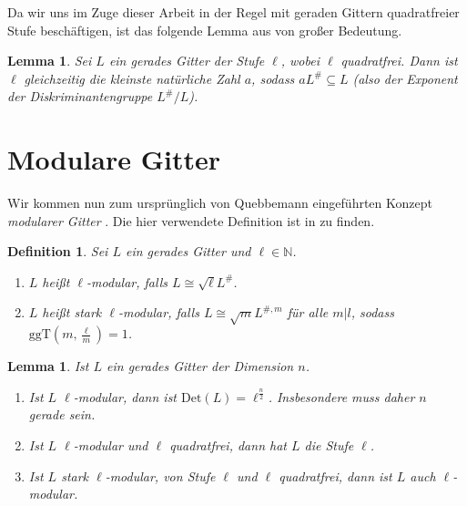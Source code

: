 \documentclass[12pt,a4paper,halfparskip,headsepline,bibtotocnumbered]{scrreprt}
\theoremstyle{nummermitklammern}
\newtheorem{definition}[defsatzusw]{Definition}
\newtheorem{lemma}[defsatzusw]{Lemma}
\theoremstyle{nonumberbreak}
\newcommand{\N}{\mathbb{N}}
\newcommand{\Det}{\text{Det}}
\begin{document}
Da wir uns im Zuge dieser Arbeit in der Regel mit geraden Gittern quadratfreier Stufe beschäftigen, ist das folgende Lemma aus \cite[Lemma 1.1.1]{juergens} von großer Bedeutung.

\begin{framed}
	\begin{lemma}\label{lem:level}
		Sei $L$ ein gerades Gitter der Stufe $\ell$, wobei $\ell$ quadratfrei. Dann ist $\ell$ gleichzeitig die kleinste natürliche Zahl $a$, sodass $a L^\# \subseteq L$ (also der Exponent der Diskriminantengruppe $L^\# / L$).
	\end{lemma}
\end{framed}

\section{Modulare Gitter}

Wir kommen nun zum ursprünglich von Quebbemann eingeführten Konzept \textit{modularer Gitter} \cite{quebbemann}. Die hier verwendete Definition ist in \cite{fluckiger} zu finden.

\begin{framed}
	\begin{definition}
		Sei $L$ ein gerades Gitter und $\ell \in \N$.
		\begin{enumerate}[label=(\roman*)]
			\item $L$ heißt \textit{$\ell$-modular}, falls $L \cong \sqrt{\ell}L^\#$.
			\item $L$ heißt \textit{stark $\ell$-modular}, falls $L \cong \sqrt{m} L^{\#,m}$ für alle $m \vert l$, sodass $\text{ggT}(m,\frac{\ell}{m}) = 1$.
		\end{enumerate}
	\end{definition}
\end{framed}

\begin{framed}
	\begin{lemma}\label{lem:mod}
		Ist $L$ ein gerades Gitter der Dimension $n$.
		\begin{enumerate}[label=(\roman*)]
			\item Ist $L$ $\ell$-modular, dann ist $\Det(L) = \ell^{\frac{n}{2}}$. Insbesondere muss daher $n$ gerade sein.
			\item Ist $L$ $\ell$-modular und $\ell$ quadratfrei, dann hat $L$ die Stufe $\ell$.
			\item Ist $L$ stark $\ell$-modular, von Stufe $\ell$ und $\ell$ quadratfrei, dann ist $L$ auch $\ell$-modular.
		\end{enumerate}
	\end{lemma}
\end{framed}
\end{document}

